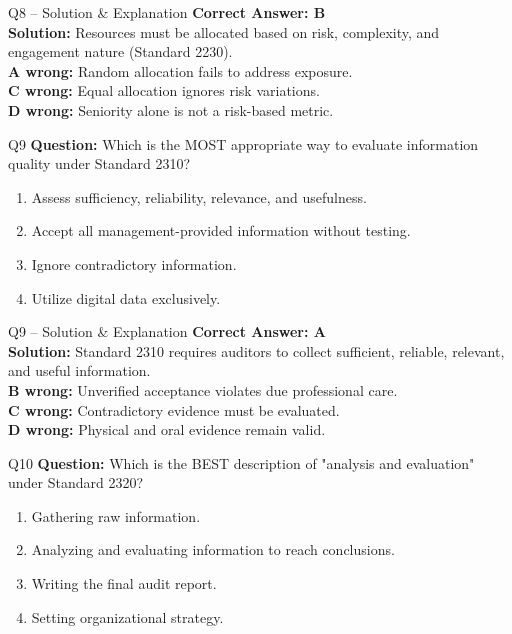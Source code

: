 \documentclass[aspectratio=169,10pt]{beamer}
\begin{document}
	\begin{frame}[t]{Q8 -- Solution \& Explanation}
		\small
		\textbf{Correct Answer: B} \\[4pt]
		\textbf{Solution:} Resources must be allocated based on risk, complexity, and engagement nature (Standard 2230). \\[4pt]
		\textbf{A wrong:} Random allocation fails to address exposure. \\[2pt]
		\textbf{C wrong:} Equal allocation ignores risk variations. \\[2pt]
		\textbf{D wrong:} Seniority alone is not a risk-based metric.
	\end{frame}
	
	\begin{frame}[t]{Q9}
		\small
		\textbf{Question:} Which is the MOST appropriate way to evaluate information quality under Standard 2310?
		\begin{enumerate}[label=\Alph*.,itemsep=1pt,topsep=2pt]
			\item Assess sufficiency, reliability, relevance, and usefulness.
			\item Accept all management-provided information without testing.
			\item Ignore contradictory information.
			\item Utilize digital data exclusively.
		\end{enumerate}
	\end{frame}
	
	\begin{frame}[t]{Q9 -- Solution \& Explanation}
		\small
		\textbf{Correct Answer: A} \\[4pt]
		\textbf{Solution:} Standard 2310 requires auditors to collect sufficient, reliable, relevant, and useful information. \\[4pt]
		\textbf{B wrong:} Unverified acceptance violates due professional care. \\[2pt]
		\textbf{C wrong:} Contradictory evidence must be evaluated. \\[2pt]
		\textbf{D wrong:} Physical and oral evidence remain valid.
	\end{frame}
	
	\begin{frame}[t]{Q10}
		\small
		\textbf{Question:} Which is the BEST description of "analysis and evaluation" under Standard 2320?
		\begin{enumerate}[label=\Alph*.,itemsep=1pt,topsep=2pt]
			\item Gathering raw information.
			\item Analyzing and evaluating information to reach conclusions.
			\item Writing the final audit report.
			\item Setting organizational strategy.
		\end{enumerate}
	\end{frame}
	
\end{document}
